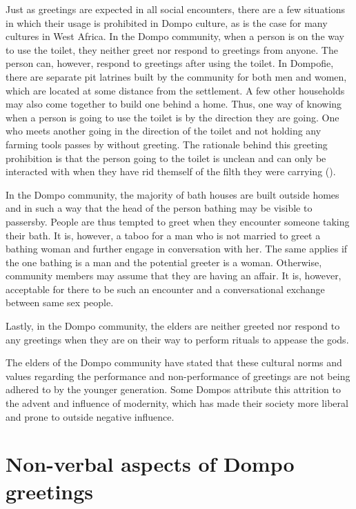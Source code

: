 \documentclass[output=paper,colorlinks,citecolor=brown]{langscibook}
\begin{document}
Just as greetings are expected in all social encounters, there are a few situations in which their usage is prohibited in Dompo culture, as is the case for many cultures in West Africa. In the Dompo community, when a person  is on the way to use the toilet, they neither greet nor respond to greetings from anyone. The person can, however, respond to greetings after using the toilet. In Dompofie, there are separate pit latrines built by the community for both men and women, which are located at some distance from the settlement. A few other  households may also come together to build one behind a home. Thus, one way of knowing when a person is going to use the toilet is by the direction they are going. One who meets another going in the direction of the toilet and not holding any farming tools passes by without greeting. The rationale behind this greeting prohibition is that the person going to the toilet is unclean and can only be interacted with when they have rid themself of the filth they were carrying (\cite{Agyekum2008, Dzameshie2002, Egblewogbe1990}). 

In the Dompo community, the majority of bath houses are built outside homes and in such a way that the head of the person bathing may be visible to passersby. People are thus tempted to greet when they encounter someone taking their bath. It is, however, a taboo for a man who is not married to greet a bathing woman and further engage in conversation with her. The same applies if the one bathing is a man and the potential greeter is a woman. Otherwise, community members may assume that they are having an affair. It is, however, acceptable for there to be such an encounter and a conversational exchange between same sex people. 

Lastly, in the Dompo community, the elders are neither greeted nor respond to any greetings when they are on their way to perform rituals to appease the gods. 

The elders of the Dompo community have stated that these cultural norms and values regarding the performance and non-performance of greetings are not being adhered to by the younger generation. Some Dompos attribute this attrition to the advent and influence of modernity, which has made their society more liberal and prone to outside negative influence.   

\section{Non-verbal aspects of Dompo greetings}
\end{document}
